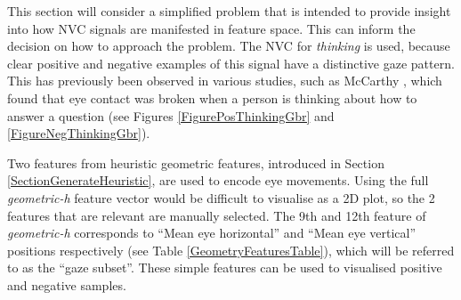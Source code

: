 This section will consider a simplified problem that is intended to provide insight into how \ac{NVC} signals are manifested in feature space. This can inform the decision on how to approach the problem. The \ac{NVC} for \textit{thinking} is used, because clear positive and negative examples of this signal have a distinctive gaze pattern. This has previously been observed in various studies, such as McCarthy \etal \cite{McCarthy2006}, which found that eye contact was broken when a person is thinking about how to answer a question (see Figures \ref{FigurePosThinkingGbr} and \ref{FigureNegThinkingGbr}). 

Two features from heuristic geometric features, introduced in Section \ref{SectionGenerateHeuristic}, are used to encode eye movements. Using the full \textit{geometric-h} feature vector would be difficult to visualise as a 2{D} plot, so the 2 features that are relevant are manually selected. The 9th and 12th feature of \textit{geometric-h} corresponds to ``Mean eye horizontal'' and ``Mean eye vertical'' positions respectively (see Table \ref{GeometryFeaturesTable}), which will be referred to as the ``gaze subset''. These simple features can be used to visualised positive and negative samples.

